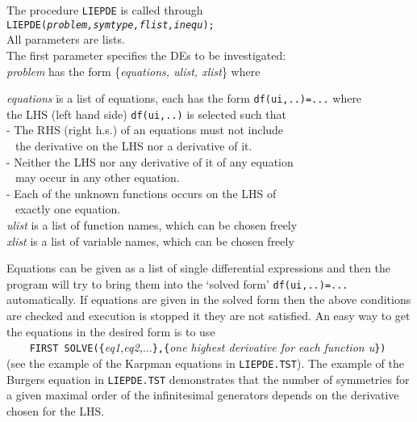 The procedure \texttt{LIEPDE} is called through \\
\texttt{LIEPDE(\textit{problem,symtype,flist,inequ}); } \\
All parameters are lists.  \\[6pt]
The first parameter specifies the DEs to be investigated: \\
\textit{problem} has the form \{\textit{equations, ulist, xlist}\} where
\begin{tabbing}
\hspace{0.5cm}
 \textit{equations } \=  is a list of equations,
              each has the form \texttt{df(ui,..)=...} where \\
       \> the LHS (left hand side) \texttt{df(ui,..)} is selected such that \\
       \>  - The RHS (right h.s.) of an equations must not include     \\
       \>$\;\,$ the derivative on the LHS nor a derivative of it.  \\
       \>  - Neither the LHS nor any derivative of it of any equation \\
       \>$\;\,$ may occur in any other equation.\\
       \>  - Each of the unknown functions occurs on the LHS of \\
       \>$\;\,$ exactly one equation.  \\
\hspace{0.5cm}
 \textit{ulist} \>  is a list of function names, which can be chosen freely \\
\hspace{0.5cm}
 \textit{xlist}  \>  is a list of variable names, which can be chosen freely 
\end{tabbing}
Equations can be given as a list of single differential expressions and then
the program will try to bring them into the `solved form' \texttt{df(ui,..)=...}
automatically. If equations are given in the solved form then the above
conditions are checked and execution is stopped it they are not satisfied.
An easy way to get the equations in the desired form is to use \\
\verb+    FIRST SOLVE({+\textit{eq1,eq2,}...\verb+},{+\textit{one highest
derivative for each function u}\verb+})+  \\
(see the example of the Karpman equations in \texttt{LIEPDE.TST}). 
The example of the Burgers equation in \texttt{LIEPDE.TST} demonstrates 
that the number of symmetries for a given maximal order of the infinitesimal
generators depends on the derivative chosen for the LHS.

